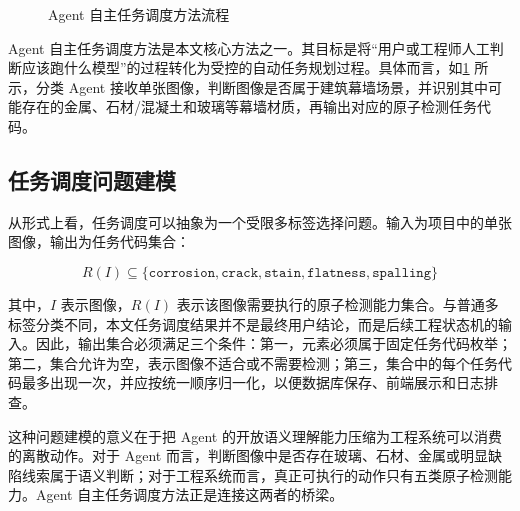 \begin{figure}[!htbp]
{
  }
  \caption{Agent 自主任务调度方法流程}\label{fig:design-agent-autonomous-task-scheduling-flow}
\end{figure}

Agent 自主任务调度方法是本文核心方法之一。其目标是将“用户或工程师人工判断应该跑什么模型”的过程转化为受控的自动任务规划过程。具体而言，如\cref{fig:design-agent-autonomous-task-scheduling-flow} 所示，分类 Agent 接收单张图像，判断图像是否属于建筑幕墙场景，并识别其中可能存在的金属、石材/混凝土和玻璃等幕墙材质，再输出对应的原子检测任务代码。

\subsection{任务调度问题建模}
\label{subsec:design-task-scheduling-problem-modeling}

从形式上看，任务调度可以抽象为一个受限多标签选择问题。输入为项目中的单张图像，输出为任务代码集合：

\begin{equation}\label{eq:design-agent-task-routing-set}
  R(I) \subseteq \{\texttt{corrosion}, \texttt{crack}, \texttt{stain}, \texttt{flatness}, \texttt{spalling}\}
\end{equation}

其中，$I$ 表示图像，$R(I)$ 表示该图像需要执行的原子检测能力集合。与普通多标签分类不同，本文任务调度结果并不是最终用户结论，而是后续工程状态机的输入。因此，输出集合必须满足三个条件：第一，元素必须属于固定任务代码枚举；第二，集合允许为空，表示图像不适合或不需要检测；第三，集合中的每个任务代码最多出现一次，并应按统一顺序归一化，以便数据库保存、前端展示和日志排查。

这种问题建模的意义在于把 Agent 的开放语义理解能力压缩为工程系统可以消费的离散动作。对于 Agent 而言，判断图像中是否存在玻璃、石材、金属或明显缺陷线索属于语义判断；对于工程系统而言，真正可执行的动作只有五类原子检测能力。Agent 自主任务调度方法正是连接这两者的桥梁。

